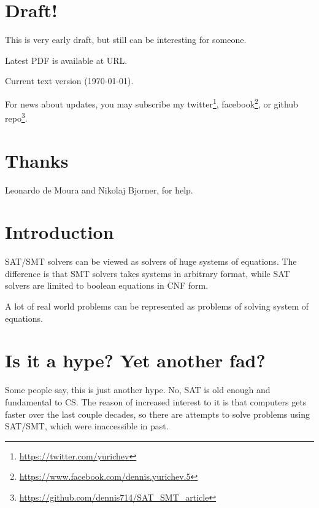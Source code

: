 
\section{Draft!}

This is very early draft, but still can be interesting for someone.

Latest PDF is available at URL.

Current text version ({\large \today}).

For news about updates, you may subscribe my 
twitter\footnote{\url{https://twitter.com/yurichev}}, 
facebook\footnote{\url{https://www.facebook.com/dennis.yurichev.5}}, 
or github repo\footnote{\url{https://github.com/dennis714/SAT_SMT_article}}.

\section{Thanks}

Leonardo de Moura and Nikolaj Bjorner, for help.

\section{Introduction}

\ac{SAT}/\ac{SMT} solvers can be viewed as solvers of huge systems of equations.
The difference is that \ac{SMT} solvers takes systems in arbitrary format,
while \ac{SAT} solvers are limited to boolean equations in \ac{CNF} form.

A lot of real world problems can be represented as problems of solving system of equations.

\section{Is it a hype? Yet another fad?}

Some people say, this is just another hype.
No, \ac{SAT} is old enough and fundamental to \ac{CS}.
The reason of increased interest to it is that computers gets faster over the last couple decades,
so there are attempts to solve problems using \ac{SAT}/\ac{SMT}, which were inaccessible in past.

